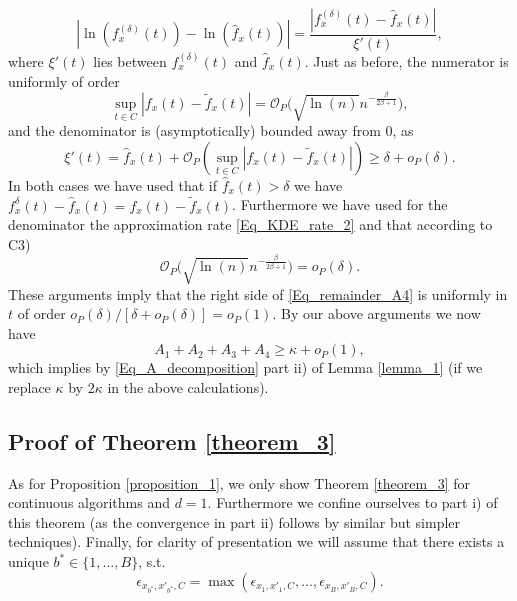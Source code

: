 \documentclass[conference]{IEEEtran}
\begin{document}
\begin{equation} \label{Eq_remainder_A4}
|\ln( f_{x}^{(\delta)}(t))-\ln( \hat f_{x}(t)) | = \frac{|f_{x}^{(\delta)}(t)-\hat f_{x}(t)|}{\xi'(t)},
\end{equation}
where $\xi'(t)$ lies between $f_{x}^{(\delta)}(t)$ and $\hat f_{x}(t)$. Just as before, the numerator is uniformly of order 
$$
\sup_{t \in C} |f_{x}(t)-\tilde f_{x}(t)| =\mathcal{O}_P \Big( \sqrt{\ln(n)} n^{-\frac{\beta}{2\beta+1}}\Big),
$$
and the denominator is (asymptotically) bounded away from $0$, as
$$
\xi'(t) = \hat f_{x}(t) +\mathcal{O}_P(\sup_{t \in C} |f_{x}(t)-\tilde f_{x}(t)|) \ge \delta +o_P(\delta).
$$
In both cases we have used that if $\hat f_x(t)>\delta$ we have $f_{x}^\delta(t)-\hat f_{x}(t) = f_{x}(t)-\tilde f_{x}(t)$.
Furthermore we have used for the denominator the approximation rate \eqref{Eq_KDE_rate_2} and that according to C3)
$$
\mathcal{O}_P \Big( \sqrt{\ln(n)} n^{-\frac{\beta}{2\beta+1}}\Big) =  o_P(\delta).
$$
These arguments imply that the right side of \eqref{Eq_remainder_A4} is uniformly in $t$ of order $o_P(\delta)/[\delta +o_P(\delta)]= o_P(1)$. By our above arguments we now have
$$
A_1+A_2+A_3+A_4 \ge \kappa +o_P(1),
$$
which implies by \eqref{Eq_A_decomposition} part ii) of Lemma \ref{lemma_1} (if we replace $\kappa$ by $2 \kappa$ in the above calculations).\\


\subsection{Proof of Theorem \ref{theorem_3}}\label{Appendix_Sec_B}

As for Proposition \ref{proposition_1}, we only show Theorem \ref{theorem_3} for continuous algorithms and $d=1$. Furthermore we confine ourselves to part i) of this theorem (as the convergence in part ii) follows by similar but simpler techniques). Finally, for clarity of presentation we will assume that there exists a unique $b^* \in \{1,...,B\}$, s.t.
\begin{equation} \label{Eq_def_b*}
    \epsilon_{x_{b^*},x'_{b^*},C} = \max(\epsilon_{x_1,x'_1,C},...,\epsilon_{x_B,x'_B,C}).
\end{equation}
\end{document}
